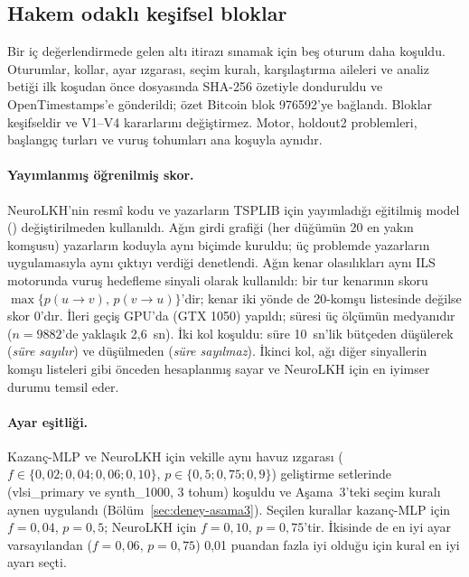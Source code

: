 \documentclass[pdflatex,sn-basic]{sn-jnl}
\begin{document}
\subsection{Hakem odaklı keşifsel bloklar}\label{sec:deney-hakem}

Bir iç değerlendirmede gelen altı itirazı sınamak için beş oturum daha koşuldu. Oturumlar, kollar,
ayar ızgarası, seçim kuralı, karşılaştırma aileleri ve analiz betiği ilk koşudan önce
 dosyasında SHA-256 özetiyle donduruldu ve OpenTimestamps'e
gönderildi; özet Bitcoin blok 976592'ye bağlandı. Bloklar keşifseldir ve V1--V4 kararlarını değiştirmez. Motor, holdout2 problemleri,
başlangıç turları ve vuruş tohumları ana koşuyla aynıdır.

\paragraph{Yayımlanmış öğrenilmiş skor.}
NeuroLKH'nin \citep{xin_2021_neurolkh} resmî kodu ve yazarların TSPLIB için yayımladığı eğitilmiş
model () değiştirilmeden kullanıldı. Ağın girdi grafiği (her düğümün 20 en yakın
komşusu) yazarların koduyla aynı biçimde kuruldu; üç problemde yazarların uygulamasıyla aynı çıktıyı
verdiği denetlendi. Ağın kenar olasılıkları aynı ILS motorunda vuruş hedefleme sinyali olarak
kullanıldı: bir tur kenarının skoru $\max\{p(u\to v),\,p(v\to u)\}$'dir; kenar iki yönde de
20-komşu listesinde değilse skor 0'dır. İleri geçiş GPU'da (GTX 1050) yapıldı; süresi üç ölçümün
medyanıdır ($n=9882$'de yaklaşık 2,6~sn). İki kol koşuldu: süre 10~sn'lik bütçeden düşülerek
(\emph{süre sayılır}) ve düşülmeden (\emph{süre sayılmaz}). İkinci kol, ağı diğer sinyallerin komşu
listeleri gibi önceden hesaplanmış sayar ve NeuroLKH için en iyimser durumu temsil eder.

\paragraph{Ayar eşitliği.}
Kazanç-MLP ve NeuroLKH için vekille aynı havuz ızgarası ($f\in\{0{,}02;0{,}04;0{,}06;0{,}10\}$,
$p\in\{0{,}5;0{,}75;0{,}9\}$) geliştirme setlerinde (vlsi\_primary ve synth\_1000, 3 tohum) koşuldu
ve Aşama~3'teki seçim kuralı aynen uygulandı (Bölüm~\ref{sec:deney-asama3}). Seçilen kurallar
kazanç-MLP için $f=0{,}04$, $p=0{,}5$; NeuroLKH için $f=0{,}10$, $p=0{,}75$'tir. İkisinde de en iyi
ayar varsayılandan ($f=0{,}06$, $p=0{,}75$) 0,01 puandan fazla iyi olduğu için kural en iyi ayarı seçti.
\end{document}

